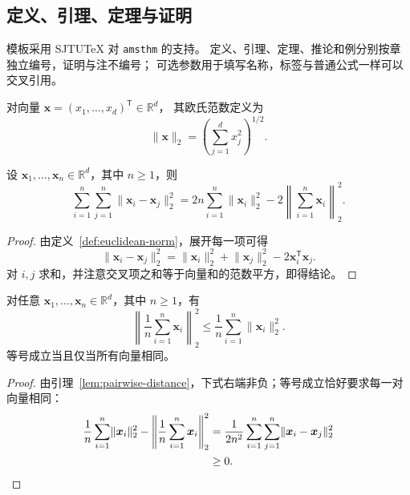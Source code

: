 \subsection{定义、引理、定理与证明}

模板采用 SJTUTeX 对 \texttt{amsthm} 的支持。
定义、引理、定理、推论和例分别按章独立编号，证明与注不编号；
可选参数用于填写名称，标签与普通公式一样可以交叉引用。

\begin{definition}[欧氏范数]
\label{def:euclidean-norm}
对向量 $\boldsymbol{x}=(x_1,\ldots,x_d)^{\mathsf{T}}\in\mathbb{R}^d$，
其欧氏范数定义为
\[
\lVert\boldsymbol{x}\rVert_2
  =\left(\sum_{j=1}^{d}x_j^2\right)^{1/2}.
\]
\end{definition}

\begin{lemma}[平方和恒等式]
\label{lem:pairwise-distance}
设 $\boldsymbol{x}_1,\ldots,\boldsymbol{x}_n\in\mathbb{R}^d$，其中 $n\geq1$，则
\begin{equation}
\sum_{i=1}^{n}\sum_{j=1}^{n}
  \lVert\boldsymbol{x}_i-\boldsymbol{x}_j\rVert_2^2
  =2n\sum_{i=1}^{n}\lVert\boldsymbol{x}_i\rVert_2^2
   -2\left\lVert\sum_{i=1}^{n}\boldsymbol{x}_i\right\rVert_2^2.
\label{eq:pairwise-distance}
\end{equation}
\end{lemma}

\begin{proof}
由定义~\ref{def:euclidean-norm}，展开每一项可得
\[
\lVert\boldsymbol{x}_i-\boldsymbol{x}_j\rVert_2^2
=\lVert\boldsymbol{x}_i\rVert_2^2
+\lVert\boldsymbol{x}_j\rVert_2^2
-2\boldsymbol{x}_i^{\mathsf{T}}\boldsymbol{x}_j.
\]
对 $i,j$ 求和，并注意交叉项之和等于向量和的范数平方，即得结论。
\end{proof}

\begin{theorem}[均值向量的范数界]
\label{thm:mean-norm-bound}
对任意 $\boldsymbol{x}_1,\ldots,\boldsymbol{x}_n\in\mathbb{R}^d$，其中 $n\geq1$，有
\begin{equation}
\left\lVert\frac{1}{n}\sum_{i=1}^{n}\boldsymbol{x}_i\right\rVert_2^2
\leq\frac{1}{n}\sum_{i=1}^{n}\lVert\boldsymbol{x}_i\rVert_2^2.
\label{eq:mean-norm-bound}
\end{equation}
等号成立当且仅当所有向量相同。
\end{theorem}

\begin{proof}
由引理~\ref{lem:pairwise-distance}，下式右端非负；等号成立恰好要求每一对向量相同：
\begin{align*}
\frac{1}{n}\sum_{i=1}^{n}\lVert\boldsymbol{x}_i\rVert_2^2
-\left\lVert\frac{1}{n}\sum_{i=1}^{n}\boldsymbol{x}_i\right\rVert_2^2
&=\frac{1}{2n^2}\sum_{i=1}^{n}\sum_{j=1}^{n}
  \lVert\boldsymbol{x}_i-\boldsymbol{x}_j\rVert_2^2 \\
&\geq0.\qedhere
\end{align*}
\end{proof}

